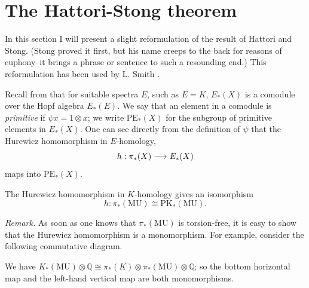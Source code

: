 \documentclass[../main]{subfiles}
\begin{document}

\chapter{The Hattori-Stong theorem}
\label{sec:p2c14}

In this section I will present a slight reformulation of the result
of Hattori and Stong. (Stong proved it first, but his name creeps to the
back for reasons of euphony--it brings a phrase or sentence to such a
resounding end.) This reformulation has been used by L. Smith \cite{smith}. 

Recall from \cite[Lecture 3]{adams3} that for suitable spectra $E$, such as $E=K$, $E_\ast(X)$ is a comodule over the Hopf algebra $E_\ast(E)$. We say that an element in a comodule is \emph{primitive} if $\psi x = 1\otimes x$; we write $\mathrm{PE}_\ast(X)$ for the subgroup of primitive elements in $E_\ast(X)$. One can see directly from the definition of $\psi$ that the Hurewicz homomorphism in $E$-homology, \[h:\pi_\ast(X)\longrightarrow E_\ast(X)\] maps into $\mathrm{PE}_\ast(X)$. 
\begin{theorem}
\label{thm:p2c14.1}
The Hurewicz homomorphism in $K$-homology gives an isomorphism \[h:\pi_\ast(\mathrm{MU})\cong\mathrm{PK}_\ast(\mathrm{MU}).\]
\end{theorem}
\emph{Remark.} As soon as one knows that $\pi_\ast(\mathrm{MU})$ is torsion-free, it is easy to show that the Hurewicz homomorphism is a monomorphism. For example, consider the following commutative diagram.
\begin{center}
\end{center}
We have $K_\ast(\mathrm{MU})\otimes\mathbb{Q}\cong\pi_\ast(K)\otimes\pi_\ast(\mathrm{MU})\otimes\mathbb{Q}$; so the bottom horizontal map and the left-hand vertical map are both monomorphisms.
\end{document}
